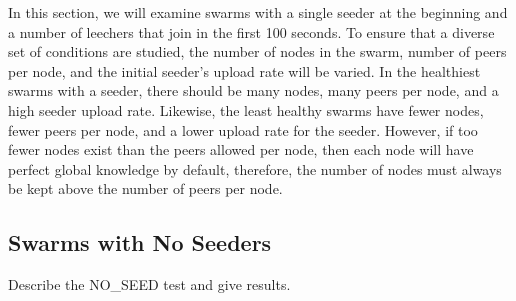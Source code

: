 In this section, we will examine swarms with a single seeder at the beginning
and a number of leechers that join in the first 100 seconds. To ensure
that a diverse set of conditions are studied, the number of nodes in the swarm, 
number of peers per node, and the initial seeder's upload rate will be varied.
In the healthiest swarms with a seeder, there should be many nodes, many peers per node, and
a high seeder upload rate. Likewise, the least healthy swarms have fewer nodes,
fewer peers per node, and a lower upload rate for the seeder. However, if too fewer
nodes exist than the peers allowed per node, then each node will have perfect global
knowledge by default, therefore, the number of nodes must always be kept above
the number of peers per node. 









\subsection{Swarms with No Seeders}

Describe the NO\_SEED test and give results.
